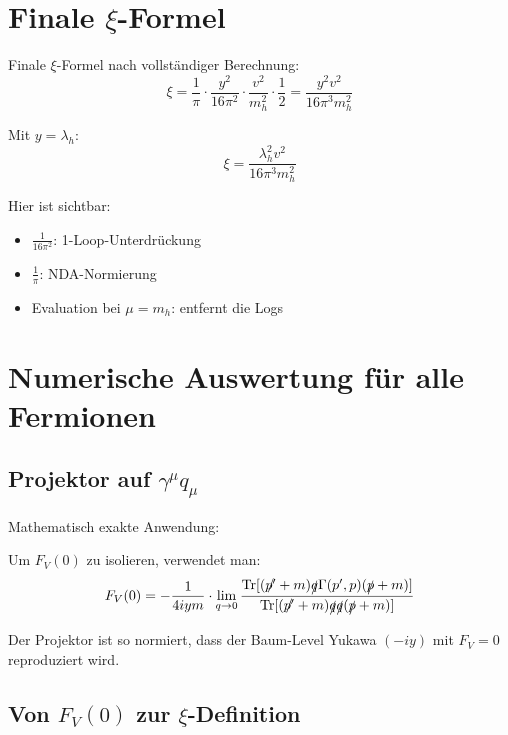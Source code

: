 \documentclass[12pt,a4paper]{article}
\theoremstyle{definition}
\begin{document}
	\section{Finale $\xi$-Formel}
	
	\begin{formel}
		Finale $\xi$-Formel nach vollständiger Berechnung:
		\begin{equation}
			\xi = \frac{1}{\pi} \cdot \frac{y^2}{16\pi^2} \cdot \frac{v^2}{m_h^2} \cdot \frac{1}{2} = \frac{y^2v^2}{16\pi^3m_h^2}
		\end{equation}
		
		Mit $y = \lambda_h$:
		\begin{equation}
			\boxed{\xi = \frac{\lambda_h^2v^2}{16\pi^3m_h^2}}
		\end{equation}
		
		Hier ist sichtbar:
		\begin{itemize}
			\item $\frac{1}{16\pi^2}$: 1-Loop-Unterdrückung
			\item $\frac{1}{\pi}$: NDA-Normierung
			\item Evaluation bei $\mu = m_h$: entfernt die Logs
		\end{itemize}
	\end{formel}
	
	\section{Numerische Auswertung für alle Fermionen}
	
	\subsection{Projektor auf $\gamma^\mu q_\mu$}
	
	Mathematisch exakte Anwendung:
	
	Um $F_V(0)$ zu isolieren, verwendet man:
	\begin{equation}
		F_V(0) = -\frac{1}{4iym} \cdot \lim_{q\to0} \frac{\text{Tr}[(\slashed{p'} + m)\slashed{q} \Gamma(p',p)(\slashed{p} + m)]}{\text{Tr}[(\slashed{p'} + m)\slashed{q}\slashed{q}(\slashed{p} + m)]}
	\end{equation}
	
	Der Projektor ist so normiert, dass der Baum-Level Yukawa $(-iy)$ mit $F_V = 0$ reproduziert wird.
	
	\subsection{Von $F_V(0)$ zur $\xi$-Definition}
	
\end{document}
